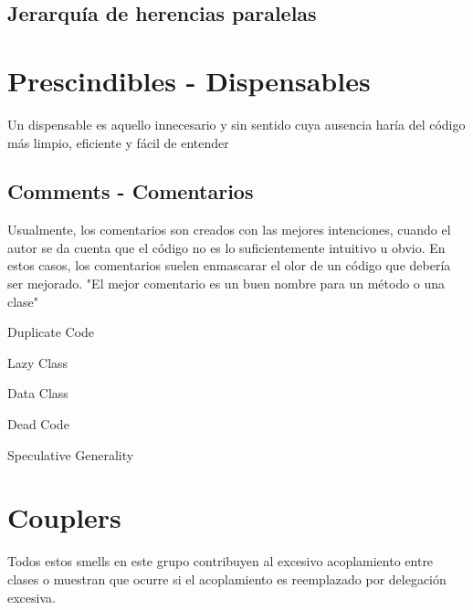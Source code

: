 \documentclass[11pt,a4paper,oneside]{book}
\begin{document}
\subsection{Jerarquía de herencias paralelas}




\section{Prescindibles - Dispensables}


Un dispensable es aquello innecesario y sin sentido cuya ausencia haría del código más limpio, eficiente y fácil de entender


    \subsection{Comments - Comentarios}
    \label{comments}
    Usualmente, los comentarios son creados con las mejores intenciones, cuando el autor se da cuenta que el código no es lo suficientemente intuitivo u obvio. En estos casos, los comentarios suelen enmascarar el olor de un código que debería ser mejorado.
    \newline
    \centering "El mejor comentario es un buen nombre para un método o una clase"
    \newline
    
    
    
    Duplicate Code
    
    Lazy Class

    Data Class

    Dead Code
    \label{deadcode}

    Speculative Generality


\section{Couplers}

Todos estos smells en este grupo contribuyen al excesivo acoplamiento entre clases o muestran que ocurre si el acoplamiento es reemplazado por delegación excesiva. 
\end{document}
